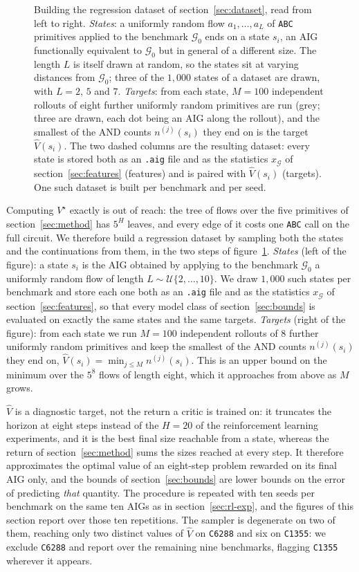 \documentclass{article}
\begin{document}
\begin{figure}[t]
  \caption{Building the regression dataset of section~\ref{sec:dataset}, read from left to right. \emph{States}: a uniformly random flow $a_1,\dots,a_L$ of \texttt{ABC} primitives applied to the benchmark $\mathcal{G}_0$ ends on a state $s_i$, an AIG functionally equivalent to $\mathcal{G}_0$ but in general of a different size. The length $L$ is itself drawn at random, so the states sit at varying distances from $\mathcal{G}_0$; three of the $1{,}000$ states of a dataset are drawn, with $L = 2$, $5$ and $7$. \emph{Targets}: from each state, $M=100$ independent rollouts of eight further uniformly random primitives are run (grey; three are drawn, each dot being an AIG along the rollout), and the smallest of the AND counts $n^{(j)}(s_i)$ they end on is the target $\widehat{V}(s_i)$. The two dashed columns are the resulting dataset: every state is stored both as an \texttt{.aig} file and as the statistics $x_\mathcal{G}$ of section~\ref{sec:features} (features) and is paired with $\widehat{V}(s_i)$ (targets). One such dataset is built per benchmark and per seed.}
  \label{fig:dataset}
\end{figure}
Computing $V^\star$ exactly is out of reach: the tree of flows over the five primitives of section~\ref{sec:method} has $5^H$ leaves, and every edge of it costs one \texttt{ABC} call on the full circuit.
We therefore build a regression dataset by sampling both the states and the continuations from them, in the two steps of figure~\ref{fig:dataset}.
\emph{States} (left of the figure): a state $s_i$ is the AIG obtained by applying to the benchmark $\mathcal{G}_0$ a uniformly random flow of length $L\sim\mathcal{U}\{2,\dots,10\}$.
We draw $1{,}000$ such states per benchmark and store each one both as an \texttt{.aig} file and as the statistics $x_\mathcal{G}$ of section~\ref{sec:features}, so that every model class of section~\ref{sec:bounds} is evaluated on exactly the same states and the same targets.
\emph{Targets} (right of the figure): from each state we run $M = 100$ independent rollouts of $8$ further uniformly random primitives and keep the smallest of the AND counts $n^{(j)}(s_i)$ they end on, $\widehat{V}(s_i) = \min_{j \leq M} n^{(j)}(s_i)$.
This is an upper bound on the minimum over the $5^8$ flows of length eight, which it approaches from above as $M$ grows.

$\widehat{V}$ is a diagnostic target, not the return a critic is trained on: it truncates the horizon at eight steps instead of the $H=20$ of the reinforcement learning experiments, and it is the best final size reachable from a state, whereas the return of section~\ref{sec:method} sums the sizes reached at every step.
It therefore approximates the optimal value of an eight-step problem rewarded on its final AIG only, and the bounds of section~\ref{sec:bounds} are lower bounds on the error of predicting \emph{that} quantity.
The procedure is repeated with ten seeds per benchmark on the same ten AIGs as in section~\ref{sec:rl-exp}, and the figures of this section report over those ten repetitions.
The sampler is degenerate on two of them, reaching only two distinct values of $\widehat{V}$ on \texttt{C6288} and six on \texttt{C1355}: we exclude \texttt{C6288} and report over the remaining nine benchmarks, flagging \texttt{C1355} wherever it appears.
\end{document}
